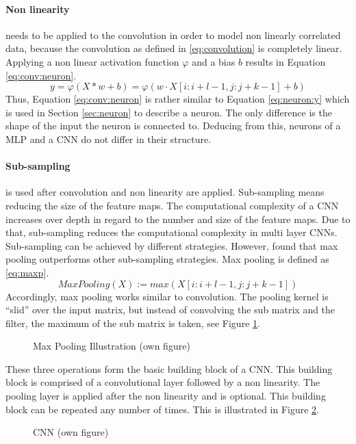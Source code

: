		\paragraph{Non linearity} needs to be applied to the convolution in order to model non linearly correlated data, because the convolution as defined in \eqref{eq:convolution} is completely linear. Applying a non linear activation function $\varphi$ and a bias $b$ results in Equation \eqref{eq:conv:neuron}.\autocite{LeCun.1998}
		\begin{equation}
			y = \varphi(X * w + b) = \varphi(w \cdot X[i:i+l-1, j:j+k-1] + b)
			\label{eq:conv:neuron}
		\end{equation}
		Thus, Equation \eqref{eq:conv:neuron} is rather similar to Equation \eqref{eq:neuron:y} which is used in Section \ref{sec:neuron} to describe a neuron. The only difference is the shape of the input the neuron is connected to. Deducing from this, neurons of a \ac{MLP} and a \ac{CNN} do not differ in their structure.
		\paragraph{Sub-sampling} is used after convolution and non linearity are applied. \autocite{LeCun.1998} Sub-sampling means reducing the size of the feature maps. The computational complexity of a \ac{CNN} increases over depth in regard to the number and size of the feature maps.\autocites{Conneau.2016}{Johnson.2017} Due to that, sub-sampling reduces the computational complexity in multi layer \ac{CNN}s. Sub-sampling can be achieved by different strategies. However, \cite{Zhang.2015c} found that max pooling outperforms other sub-sampling strategies. Max pooling is defined as \eqref{eq:maxp}.\autocite{Boureau.2010}
		\begin{equation}
			\label{eq:maxp}
			MaxPooling(X) := max(X[i:i+l-1, j:j+k-1])
		\end{equation}
		Accordingly, max pooling works similar to convolution. The pooling kernel is \enquote{slid} over the input matrix, but instead of convolving the sub matrix and the filter, the maximum of the sub matrix is taken, see Figure \ref{img:maxp}.
		\begin{figure}[H]
			\centering
			
			\caption{Max Pooling Illustration (own figure)} \label{img:maxp}
		\end{figure}
		\par
		These three operations form the basic building block of a \ac{CNN}. This building block is comprised of a convolutional layer followed by a non linearity. The pooling layer is applied after the non linearity and is optional. This building block can be repeated any number of times. \autocite{LeCun.1998} This is illustrated in Figure \ref{img:cnn}.
		\begin{figure}[H]
			\centering
			
			\caption{\ac{CNN} (own figure)} \label{img:cnn}
		\end{figure}
